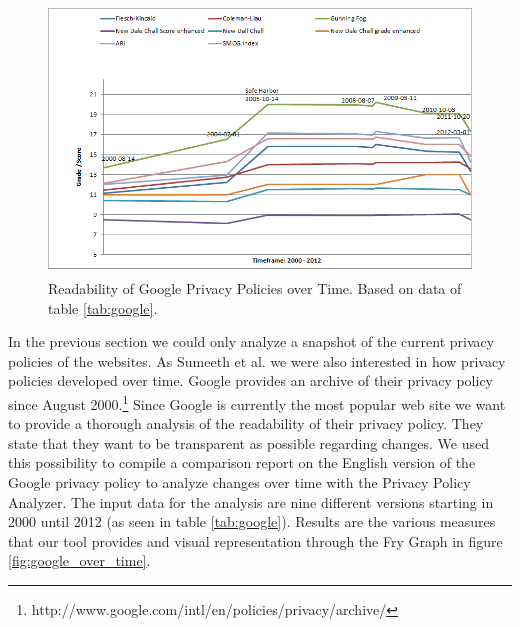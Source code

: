 \documentclass[runningheads,a4paper]{llncs}
\begin{document}
\begin{figure}
\centering
\includegraphics[width=\textwidth]{Bilder/google_over_time_diagram.png}
\caption{Readability of Google Privacy Policies over Time. Based on data of table \ref{tab:google}.}
\label{fig:google_over_time_diagram}
\end{figure}
In the previous section we could only analyze a snapshot of the current privacy policies of the websites. As Sumeeth et al. \cite{Sumeeth2010} we were also interested in how privacy policies developed over time. Google provides an archive of their privacy policy since August 2000.\footnote{http://www.google.com/intl/en/policies/privacy/archive/} Since Google is currently the most popular web site we want to provide a thorough analysis of the readability of their privacy policy. They state that they want to be transparent as possible regarding changes. We used this possibility to compile a comparison report on the English version of the Google privacy policy to analyze changes over time with the Privacy Policy Analyzer. The input data for the analysis are nine different versions starting in 2000 until 2012 (as seen in table \ref{tab:google}). Results are the various measures that our tool provides and visual representation through the Fry Graph in figure \ref{fig:google_over_time}.
\end{document}
